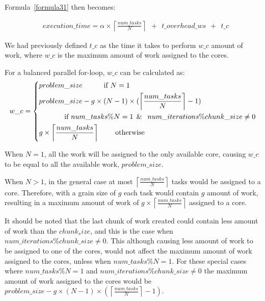 Formula~\ref{formula31} then becomes:

\begin{equation}\label{formula32}
\begin{aligned}
&execution\_time = 
\alpha\times{\left\lceil{\frac{num\_{tasks}}{N}}\right\rceil\:\:+\:\:t\_{overhead\_{ws}}\:\:+\:\:t\_c}
\end{aligned}
\end{equation}

We had previously defined $t\_c$ as the time it takes to perform $w\_c$ amount of work, where $w\_c$ is the maximum amount of work assigned to the cores. 

For a balanced parallel for-loop, $w\_c$ can be calculated as:
\vspace{\baselineskip} 
\begin{equation}\label{formula2}
w\_c =\left\{
\begin{aligned}
&problem\_{size} \:\:\:\:\:\:\:\:\:\:\:\:\text{ if } N=1\\
&problem\_{size}-g\times{(N-1)}\times(\left \lceil{\frac{num\_{tasks}}{N}}\right \rceil-1) \\
&\:\:\:\:\:\:\:\:\:\:\:\:\:\:\:\:\text{if }num\_{tasks}\%N=1\text{\:\:\&\:\: }num\_{iterations}\%chunk\_{size}\neq0\\ 
&g\times\left \lceil{\frac{num\_{tasks}}{N}}\right \rceil  \:\:\:\:\:\:\:\:\:\:    \text{otherwise}
\end{aligned}
\right.
\end{equation}
\vspace{\baselineskip}

When $N=1$, all the work will be assigned to the only available core, causing $w\_c$ to be equal to all the available work, $problem\_{size}$.

When $N>1$, in the general case at most $\left \lceil{\frac{num\_{tasks}}{N}}\right \rceil$ tasks would be assigned to a core. Therefore, with a grain size of $g$ each task would contain $g$ amount of work, resulting in a maximum amount of work of $g\times{\left \lceil{\frac{num\_{tasks}}{N}}\right \rceil}$ assigned to a core.

It should be noted that the last chunk of work created could contain less amount of work than the $chunk_size$, and this is the case when $num\_{iterations}\%chunk\_{size}\neq0$. This although causing less amount of work to be assigned to one of the cores, would not affect the maximum amount of work assigned to the cores, unless when $num\_{tasks}\%N=1$. For these special cases where $num\_{tasks}\%N=1$ and  $num\_{iterations}\%chunk\_{size}\neq0$ the maximum amount of work assigned to the cores would be $problem\_{size}-g\times{(N-1)}\times(\left \lceil{\frac{num\_{tasks}}{N}}\right \rceil-1)$. 

